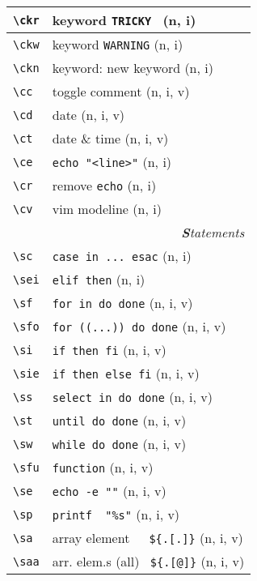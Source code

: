 \documentclass[oneside,12pt,a4paper,DIV18]{scrartcl}
\begin{document}
\begin{center}
\begin{tabular}[]{|p{11mm}|p{59mm}|}
\hline \verb'\ckr' & keyword \verb'TRICKY '           \hfill (n, i)\\
\hline \verb'\ckw' & keyword \verb'WARNING'           \hfill (n, i)\\
\hline \verb'\ckn' & keyword: new keyword             \hfill (n, i)\\
\hline \verb'\cc'  & toggle comment                   \hfill (n, i, v)\\
\hline \verb'\cd'  & date                             \hfill (n, i, v)\\
\hline \verb'\ct'  & date \& time                     \hfill (n, i, v)\\
\hline \verb'\ce'  & \verb'echo "<line>"'             \hfill (n, i)\\
\hline \verb'\cr'  & remove \verb'echo'               \hfill (n, i)\\
\hline \verb'\cv'  & vim modeline                     \hfill (n, i)\\
\hline 
\hline
\multicolumn{2}{|r|}{\textsl{\textbf{S}tatements}}\\
\hline \verb'\sc'  & \verb'case in ... esac'            \hfill (n, i)\\
\hline \verb'\sei' & \verb'elif then'                   \hfill (n, i)\\
\hline \verb'\sf'  & \verb'for in do done'              \hfill (n, i, v)\\
\hline \verb'\sfo' & \verb'for ((...)) do done'         \hfill (n, i, v)\\
\hline \verb'\si'  & \verb'if then fi'                  \hfill (n, i, v)\\
\hline \verb'\sie' & \verb'if then else fi'             \hfill (n, i, v)\\
\hline \verb'\ss'  & \verb'select in do done'           \hfill (n, i, v)\\
\hline \verb'\st'  & \verb'until do done'               \hfill (n, i, v)\\
\hline \verb'\sw'  & \verb'while do done'               \hfill (n, i, v)\\
\hline \verb'\sfu' & \verb'function'                    \hfill (n, i, v)\\
\hline \verb'\se'  & \verb'echo -e ""'                  \hfill (n, i, v)\\
\hline \verb'\sp'  & \verb'printf  "%s"'                \hfill (n, i, v)\\
\hline \verb'\sa'  & array element\ \ \ \verb'${.[.]}'  \hfill (n, i, v)\\
\hline \verb'\saa' & arr. elem.s (all) \ \verb'${.[@]}'    \hfill (n, i, v)\\

\end{tabular}
\end{center}
\end{document}

